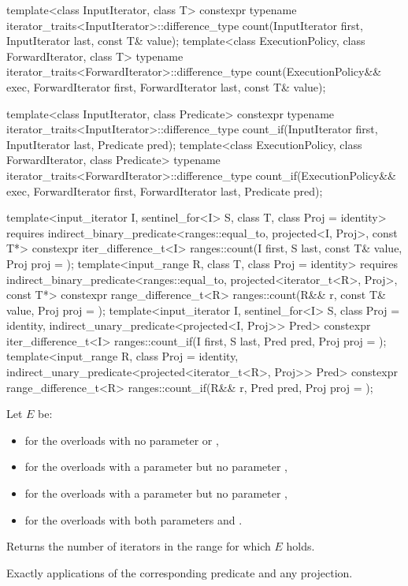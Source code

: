 %
%
\begin{itemdecl}
template<class InputIterator, class T>
  constexpr typename iterator_traits<InputIterator>::difference_type
    count(InputIterator first, InputIterator last, const T& value);
template<class ExecutionPolicy, class ForwardIterator, class T>
  typename iterator_traits<ForwardIterator>::difference_type
    count(ExecutionPolicy&& exec,
          ForwardIterator first, ForwardIterator last, const T& value);

template<class InputIterator, class Predicate>
  constexpr typename iterator_traits<InputIterator>::difference_type
    count_if(InputIterator first, InputIterator last, Predicate pred);
template<class ExecutionPolicy, class ForwardIterator, class Predicate>
  typename iterator_traits<ForwardIterator>::difference_type
    count_if(ExecutionPolicy&& exec,
             ForwardIterator first, ForwardIterator last, Predicate pred);

template<input_iterator I, sentinel_for<I> S, class T, class Proj = identity>
  requires indirect_binary_predicate<ranges::equal_to, projected<I, Proj>, const T*>
  constexpr iter_difference_t<I>
    ranges::count(I first, S last, const T& value, Proj proj = {});
template<input_range R, class T, class Proj = identity>
  requires indirect_binary_predicate<ranges::equal_to, projected<iterator_t<R>, Proj>, const T*>
  constexpr range_difference_t<R>
    ranges::count(R&& r, const T& value, Proj proj = {});
template<input_iterator I, sentinel_for<I> S, class Proj = identity,
         indirect_unary_predicate<projected<I, Proj>> Pred>
  constexpr iter_difference_t<I>
    ranges::count_if(I first, S last, Pred pred, Proj proj = {});
template<input_range R, class Proj = identity,
         indirect_unary_predicate<projected<iterator_t<R>, Proj>> Pred>
  constexpr range_difference_t<R>
    ranges::count_if(R&& r, Pred pred, Proj proj = {});
\end{itemdecl}

\begin{itemdescr}
\pnum
Let $E$ be:
\begin{itemize}
\item
   for the overloads
  with no parameter  or ,
\item
   for the overloads
  with a parameter  but no parameter ,
\item
   for the overloads
  with a parameter  but no parameter ,
\item
   for the overloads
  with both parameters  and .
\end{itemize}

\pnum
\effects
Returns the number of iterators  in the range 
for which $E$ holds.

\pnum
\complexity
Exactly  applications
of the corresponding predicate and any projection.
\end{itemdescr}

